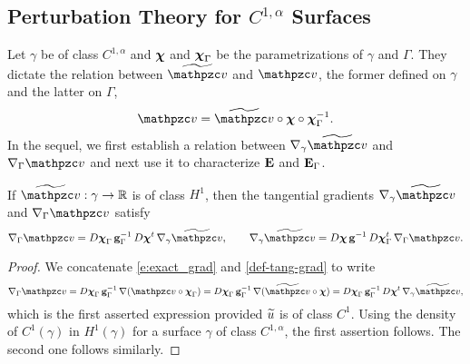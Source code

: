 \subsection{Perturbation Theory for $C^{1,\alpha}$ Surfaces}\label{S:perturb-C1alpha}
%
Let $\gamma$ be of class $C^{1,\alpha}$ and
${\boldsymbol \chi}$ and ${\boldsymbol \chi}_\Gamma$ be the parametrizations of $\gamma$ and $\Gamma$.
They dictate the relation between $\widetilde{\tv}$ and $\tv$, the former
defined on $\gamma$ and the latter on $\Gamma$,
%
\[
\tv = \wv \circ \bchi \circ \bchi_\Gamma^{-1}.
\]
%
In the sequel, we first establish a relation between $\nabla_\gamma\widetilde{\tv}$ and
$\nabla_\Gamma\tv$ and next use it to characterize ${\bf E}$ and ${\bf E}_\Gamma$.

\begin{lemma}\label{L:tan-grads-lip}
If $\wv:\gamma\to\mathbb{R}$ is of class $H^1$, then the tangential
gradients $\nabla_\gamma\widetilde{\tv}$ and $\nabla_\Gamma\tv$ satisfy
%
\begin{equation}\label{tan-grads-lip}
  \nabla_\Gamma \tv = D\bchi_\Gamma \, \bg_\Gamma^{-1} \, D\bchi^t \,
  \nabla_\gamma \widetilde{\tv},
  \qquad
  \nabla_\gamma \widetilde{\tv} = D\bchi \, \bg^{-1} \, D\bchi_\Gamma^t \,
  \nabla_\Gamma \tv.
\end{equation}
%
\end{lemma}
%
\begin{proof}
We concatenate \eqref{e:exact_grad} and \eqref{def-tang-grad} to write
%
\[
\nabla_\Gamma \tv = D\bchi_\Gamma \, \bg_\Gamma^{-1} \, \nabla (\tv\circ\bchi_\Gamma)
= D\bchi_\Gamma \, \bg_\Gamma^{-1} \, \nabla (\wv\circ\bchi)
= D\bchi_\Gamma \, \bg_\Gamma^{-1} \, D\bchi^t \, \nabla_\gamma\widetilde{\tv},
\]
%
which is the first asserted expression provided $\widetilde{u}$ is of class $C^1$. Using
the density of $C^1(\gamma)$ in $H^1(\gamma)$ for a surface $\gamma$ of class
$C^{1,\alpha}$, the first assertion follows. The second one follows similarly.
\end{proof}

